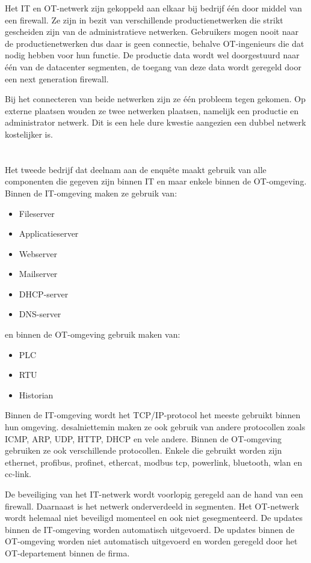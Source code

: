 Het IT en OT-netwerk zijn gekoppeld aan elkaar bij bedrijf één door middel van een firewall. Ze zijn in bezit van verschillende productienetwerken die strikt gescheiden zijn van de administratieve netwerken. Gebruikers mogen nooit naar de productienetwerken dus daar is geen connectie, behalve OT-ingenieurs die dat nodig hebben voor hun functie. De productie data wordt wel doorgestuurd naar één van de datacenter segmenten, de toegang van deze data wordt geregeld door een next generation firewall. 

Bij het connecteren van beide netwerken zijn ze één probleem tegen gekomen. Op externe plaatsen wouden ze twee netwerken plaatsen, namelijk een productie en administrator netwerk. Dit is een hele dure kwestie aangezien een dubbel netwerk kostelijker is.

\section{}
\label{sec:Bedrijf 2}
Het tweede bedrijf dat deelnam aan de enquête maakt gebruik van alle componenten die gegeven zijn binnen IT en maar enkele binnen de OT-omgeving. Binnen de IT-omgeving maken ze gebruik van:
\begin{itemize}
    \item Fileserver
    \item Applicatieserver
    \item Webserver
    \item Mailserver
    \item DHCP-server
    \item DNS-server
\end{itemize}
en binnen de OT-omgeving gebruik maken van: 
\begin{itemize}
    \item PLC
    \item RTU
    \item Historian
\end{itemize}

Binnen de IT-omgeving wordt het TCP/IP-protocol het meeste gebruikt binnen hun omgeving. desalniettemin maken ze ook gebruik van andere protocollen zoals ICMP, ARP, UDP, HTTP, DHCP en vele andere. Binnen de OT-omgeving gebruiken ze ook verschillende protocollen. Enkele die gebruikt worden zijn ethernet, profibus, profinet, ethercat, modbus tcp, powerlink, bluetooth, wlan en cc-link.

De beveiliging van het IT-netwerk wordt voorlopig geregeld aan de hand van een firewall. Daarnaast is het netwerk onderverdeeld in segmenten. Het OT-netwerk wordt helemaal niet beveiligd momenteel en ook niet gesegmenteerd. De updates binnen de IT-omgeving worden automatisch uitgevoerd. De updates binnen de OT-omgeving worden niet automatisch uitgevoerd en worden geregeld door het OT-departement binnen de firma. 

